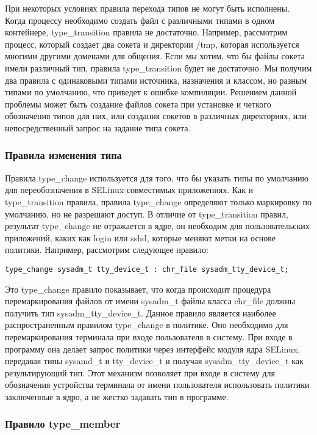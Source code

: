 \documentclass{./../class/UIR}
\begin{document}
При некоторых условиях правила перехода типов не могут быть исполнены. Когда
процессу необходимо создать файл с различными типами в одном контейнере,
type\_transition правила не достаточно. Например, рассмотрим процесс, который
создает два сокета и директории /tmp, которая используется многими другими
доменами для общения. Если мы хотим, что бы файлы сокета имели различный тип,
правила type\_transition будет не достаточно. Мы получим два правила с
одинаковыми типами источника, назначения и классом, но разным  типами по
умолчанию, что приведет к ошибке компиляции. Решением данной проблемы может быть
создание файлов сокета при установке и четкого обозначения типов для них, или
создания сокетов в различных директориях, или непосредственный запрос на задание
типа сокета.

\subsubsection{Правила изменения типа}

Правила type\_change используется для того, что бы указать типы по умолчанию для
переобозначения в SELinux-совместимых приложениях. Как и type\_transition
правила, правила type\_change определяют только маркировку по умолчанию, но не
разрешают доступ. В отличие от type\_transition правил, результат type\_change
не отражается в ядре, он необходим для пользовательских приложений, каких как login
или sshd, которые меняют метки на основе политики. Например, рассмотрим
следующее правило:
\begin{verbatim}
type_change sysadm_t tty_device_t : chr_file sysadm_tty_device_t;
\end{verbatim}
Это type\_change правило показывает, что когда происходит процедура
перемаркирования файлов от имени sysadm\_t файлы класса chr\_file должны
получить тип sysadm\_tty\_device\_t. Данное правило является наиболее распространенным
правилом type\_change в политике. Оно необходимо для перемаркирования терминала
при входе пользователя в систему. При входе в программу она делает запрос
политики через интерфейс модуля ядра SELinux, передавая типы sysamd\_t и
tty\_device\_t и получая sysadm\_tty\_device\_t как результирующий тип. Этот
механизм позволяет при входе в систему для обозначения устройства терминала от имени
пользователя использовать политики заключенные в ядро, а не жестко задавать тип
в программе.

\subsubsection{Правило type\_member}
\end{document}
